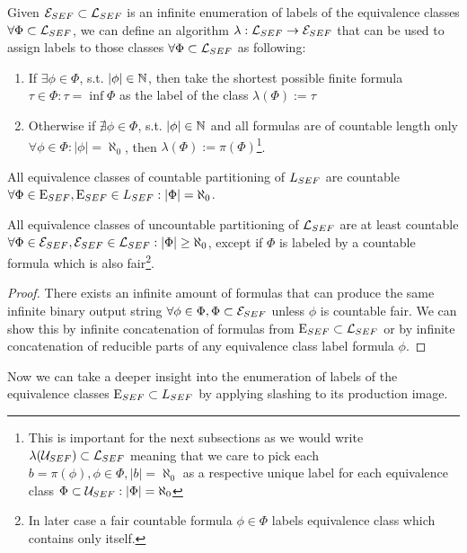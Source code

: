 \begin{definition}
  Given $\mathcal{E}_{SEF} \subset \mathcal{L}_{SEF}$ is an infinite enumeration of labels of the equivalence classes $\forall \Phi \subset \mathcal{L}_{SEF}$, we can define an algorithm $\lambda: \mathcal{L}_{SEF} \to \mathcal{E}_{SEF}$ that can be used to assign labels to those classes $\forall \Phi \subset \mathcal{L}_{SEF}$ as following:
  \begin{enumerate}
    \item If $\exists \phi \in \Phi$, s.t. $|\phi| \in \mathbb{N}$, then take the shortest possible finite formula $\tau \in \Phi: \tau = \inf \Phi$ as the label of the class $\lambda(\Phi) := \tau$
    \item Otherwise if $\nexists \phi \in \Phi$, s.t. $|\phi| \in \mathbb{N}$ and all formulas are of countable length only $\forall \phi \in \Phi: |\phi| = \aleph_0$, then $\lambda(\Phi) := \pi(\Phi)$\footnote{This is important for the next subsections as we would write $\lambda(\mathcal{U}_{SEF}) \subset \mathcal{L}_{SEF}$ meaning that we care to pick each $b = \pi(\phi), \phi \in \Phi, |b| = \aleph_0$ as a respective unique label for each equivalence class $\Phi \subset \mathcal{U}_{SEF}: |\Phi| = \aleph_0$}.
  \end{enumerate}
\end{definition}

\begin{lemma}
  All equivalence classes of countable partitioning of $L_{SEF}$ are countable $\forall \Phi \in \mathrm{E}_{SEF}, \mathrm{E}_{SEF} \in L_{SEF}: |\Phi| = \aleph_0$.
\end{lemma}

\begin{lemma}
  All equivalence classes of uncountable partitioning of $\mathcal{L}_{SEF}$ are at least countable $\forall \Phi \in \mathcal{E}_{SEF}, \mathcal{E}_{SEF} \in \mathcal{L}_{SEF}: |\Phi| \geq \aleph_0$, except if $\Phi$ is labeled by a countable formula which is also fair\footnote{In later case a fair countable formula $\phi \in \Phi$ labels equivalence class which contains only itself.}.
\end{lemma}
\begin{proof}
  There exists an infinite amount of formulas that can produce the same infinite binary output string $\forall \phi \in \Phi, \Phi \subset \mathcal{E}_{SEF}$ unless $\phi$ is countable fair. We can show this by infinite concatenation of formulas from $\mathrm{E}_{SEF} \subset \mathcal{L}_{SEF}$ or by infinite concatenation of reducible parts of any equivalence class label formula $\phi$.
\end{proof}

Now we can take a deeper insight into the enumeration of labels of the equivalence classes  $\mathrm{E}_{SEF} \subset L_{SEF}$ by applying slashing to its production image.

